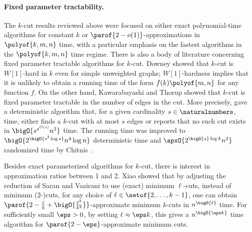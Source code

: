 \documentclass{toc}
\begin{document}
\paragraph{Fixed parameter tractability.}
The $k$-cut results reviewed above were focused on either exact
polynomial-time algorithms for constant $k$ or
$\parof{2 - o(1)}$-approximations in $\polyof{k,m,n}$ time, with a
particular emphasis on the fastest algorithms in the $\polyof{k,m,n}$
time regime. There is also a body of literature concerning fixed
parameter tractable algorithms for $k$-cut. Downey \etal
\cite{defpr-03} showed that $k$-cut is $W[1]$-hard in $k$ even for
simple unweighted graphs; $W[1]$-hardness implies that it is unlikely
to obtain a running time of the form $f(k) \polyof{m,n}$ for any
function $f$. On the other hand, Kawarabayashi and Thorup \cite{kt-11}
showed that $k$-cut is fixed parameter tractable in the number of
edges in the cut. More precisely, \cite{kt-11} gave a deterministic
algorithm that, for a given cardinality $s \in \naturalnumbers$, time,
either finds a $k$-cut with at most $s$ edges or reports that no such
cut exists in
\begin{math}
  \bigO{s^{s^{O(s)}} n^2}
\end{math}
time. The running time was improved to
\begin{math}
  \bigO{2^{\bigO{s^2 \log s}}n^4 \log n}
\end{math}
deterministic time and
\begin{math}
  \apxO{2^{\bigO{s} \log k} n^2}
\end{math}
randomized time by Chitnis \etal \cite{cchpp-16}.

Besides exact parameterized algorithms for $k$-cut, there is interest
in approximation ratios between 1 and 2.  Xiao \etal
\cite{xcy-11} showed that by adjusting the reduction of Saran and
Vazirani \cite{sv-95} to use (exact) minimum
%
%
%
$\ell$-cuts, %
instead of %
minimum (2-)cuts, for any choice of $\ell \in \setof{2,\dots,k-1}$,
%
%
one can obtain %
\begin{math}
  \parof{2 - \frac{\ell}{k} + \bigO{\frac{\ell^2}{k^2}}}
\end{math}-approximate minimum $k$-cuts in
\begin{math}
  n^{\bigO{\ell}}
\end{math}
time.  For sufficiently small $\eps > 0$, by setting
$\ell \approx \eps k$, this gives a
\begin{math}
  n^{\bigO{\eps k}}
\end{math}
time algorithm for $\parof{2 - \eps}$-approximate minimum cuts.
\end{document}
